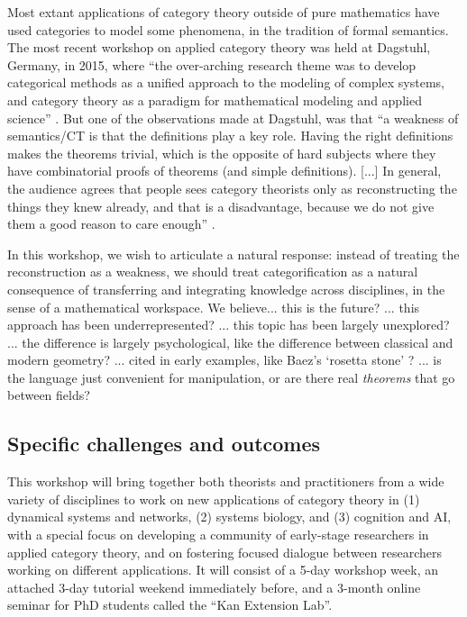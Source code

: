 \documentclass{article}
\newcommand{\redout}[1]{{\color{red}#1}}
\begin{document}
Most extant applications of category theory outside of pure mathematics have used categories to model some phenomena, in the tradition of formal semantics. The most recent workshop on applied category theory was held at Dagstuhl, Germany, in 2015, where ``the over-arching research theme was to develop categorical methods as a unified approach to the modeling of complex systems, and category theory as a paradigm for mathematical modeling and applied science'' \cite{dagstuhl}. But one of the observations made at Dagstuhl, was that ``a weakness of semantics/CT is that the definitions play a key role. Having the right definitions makes the theorems trivial, which is the opposite of hard subjects where they have combinatorial proofs of theorems (and simple definitions). [...] In general, the audience agrees that people sees category theorists only as reconstructing the things they knew already, and that is a disadvantage, because we do not give them a good reason to care enough'' \cite{selinger_at_dagstuhl}.

In this workshop, we wish to articulate a natural response: instead of treating the reconstruction as a weakness, we should treat categorification as a natural consequence of transferring and integrating knowledge across disciplines, in the sense of a mathematical workspace. \redout{We believe... this is the future? ... this approach has been underrepresented? ... this topic has been largely unexplored? ... the difference is largely psychological, like the difference between classical and modern geometry? ... cited in early examples, like Baez's `rosetta stone' \cite{baez_rosetta}? ... is the language just convenient for manipulation, or are there real \emph{theorems} that go between fields?}


\subsection{Specific challenges and outcomes}
This workshop will bring together both theorists and practitioners from a wide variety of disciplines to work on new applications of category theory in (1) dynamical systems and networks, (2) systems biology, and (3) cognition and AI, with a special focus on developing a community of early-stage researchers in applied category theory, and on fostering focused dialogue between researchers working on different applications. It will consist of a 5-day workshop week, an attached 3-day tutorial weekend immediately before, and a 3-month online seminar for PhD students called the ``Kan Extension Lab''.
\end{document}
